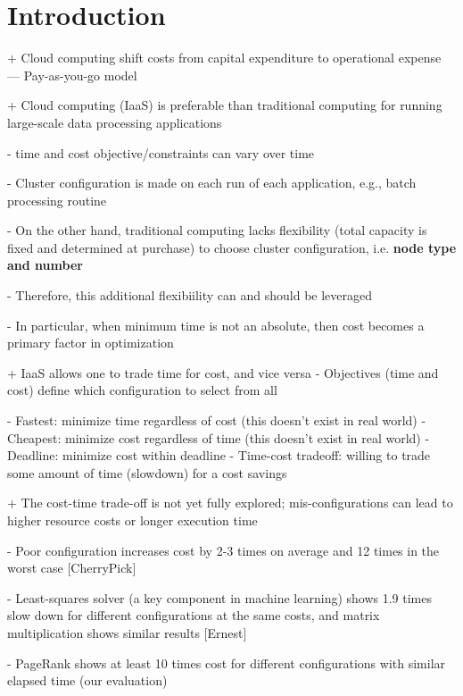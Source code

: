 \section{Introduction}
\label{sec:introduction}

\iffalse
+ Cloud computing shift costs from capital expenditure to operational
  expense --- Pay-as-you-go model

+ Cloud computing (IaaS) is preferable than traditional computing for
  running large-scale data processing applications
  
  - time and cost objective/constraints can vary over time

  - Cluster configuration is made on each run of each application, e.g.,
  batch processing routine
  
  - On the other hand, traditional computing lacks flexibility (total
  capacity is fixed and determined at purchase) to choose cluster
  configuration, i.e. \textbf{node type and number}

  - Therefore, this additional flexibiility can and should be leveraged

  - In particular, when minimum time is not an absolute, then cost becomes
  a primary factor in optimization


+ IaaS allows one to trade time for cost, and vice versa
  - Objectives (time and cost) define which configuration to select from
  all

  - Fastest: minimize time regardless of cost (this doesn't exist in
    real world)
  - Cheapest: minimize cost regardless of time (this doesn't exist in
    real world)
  - Deadline: minimize cost within deadline
  - Time-cost tradeoff: willing to trade some amount of time (slowdown)
  for a cost savings



+ The cost-time trade-off is not yet fully explored; mis-configurations
  can lead to higher resource costs or longer execution time
  
  - Poor configuration increases cost by 2-3 times on average and 12 times
  in the worst case {[}CherryPick{]}

  - Least-squares solver (a key component in machine learning) shows 1.9
  times slow down for different configurations at the same costs, and
  matrix multiplication shows similar results {[}Ernest{]}

  - PageRank shows at least 10 times cost for different configurations
  with similar elapsed time (our evaluation)

